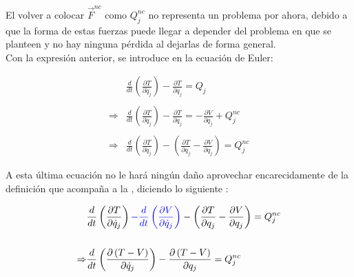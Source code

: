 \documentclass[/home/hernan-barquero/Documents/Apuntes_mecanica_teorica/main.tex]{subfiles}
\begin{document}
    El volver a colocar $ \vec{F}^{nc}$ como $ Q_{j}^{nc}$ no representa un problema por ahora, debido a que la forma de estas fuerzas puede llegar a depender del problema en que se planteen y no hay ninguna pérdida al dejarlas de forma general. \\ 

    Con la expresión anterior, se introduce en la ecuación de Euler:

    \begin{align*}
        & \frac{d}{d t} \left(\frac{\partial T}{\partial \dot{q}_{j}} \right) - \frac{\partial T}{\partial q_{j}} = Q_{j} \\ 
        \\
        \Rightarrow & \frac{d}{d t} \left(\frac{\partial T}{\partial \dot{q}_{j}} \right) - \frac{\partial T}{\partial q_{j}} = - \frac{\partial V}{\partial q_{j}} + Q_{j}^{nc} \\ 
        \\
        \Rightarrow & \frac{d}{d t} \left(\frac{\partial T}{\partial \dot{q}_{j}} \right) - \left(\frac{\partial T}{\partial q_{j}} - \frac{\partial V}{\partial q_{j}}\right) =  Q_{j}^{nc}
    \end{align*}

    A esta última ecuación no le hará ningún daño aprovechar encarecidamente de la definición que acompaña a la , diciendo lo siguiente :

    \begin{align*}
        & \frac{d}{d t} \left(\frac{\partial T}{\partial \dot{q}_{j}} \right) \textcolor{blue}{-\frac{d}{d t} \left(\frac{\partial V}{\partial \dot{q}_{j}}\right) } - \left(\frac{\partial T}{\partial q_{j}} - \frac{\partial V}{\partial q_{j}}\right) =  Q_{j}^{nc} \\ 
        \\
        \Rightarrow & \frac{d}{d t} \left(\frac{\partial \left(T - V\right) }{\partial \dot{q}_{j}} \right) - \frac{\partial \left(T - V\right)}{\partial q_{j}} =  Q_{j}^{nc} \\
    \end{align*}
\end{document}
